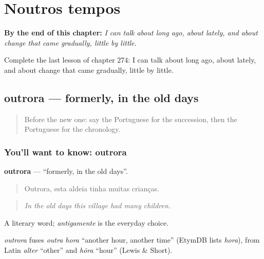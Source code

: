 
\chapter{Noutros tempos}
\label{ch:pt-noutros-tempos}

\begin{chapteropening}
\textbf{By the end of this chapter:} \emph{I can talk about long ago, about lately, and about change that came gradually, little by little.}

Complete the last lesson of chapter 274: I can talk about long ago, about lately, and about change that came gradually, little by little.
\end{chapteropening}

\section[outrora]{outrora — formerly, in the old days}

\label{lesson:PT-C274-outrora}



\begin{quote}
Before the new one: say the Portuguese for the succession, then the Portuguese for the chronology.
\end{quote}

\subsection*{You'll want to know: outrora}
\textbf{outrora} — \textquotedblleft{}formerly, in the old days\textquotedblright{}.

\begin{quote}
Outrora, esta aldeia tinha muitas crianças.
\end{quote}

\begin{quote}
\emph{In the old days this village had many children.}
\end{quote}

A literary word; \emph{antigamente} is the everyday choice.

\begin{cousinweb}
\emph{outrora} fuses \emph{outra hora} \textquotedblleft{}another hour, another time\textquotedblright{} (EtymDB lists \emph{hora}), from Latin \emph{alter} \textquotedblleft{}other\textquotedblright{} and \emph{hōra} \textquotedblleft{}hour\textquotedblright{} (Lewis \& Short).
\end{cousinweb}

